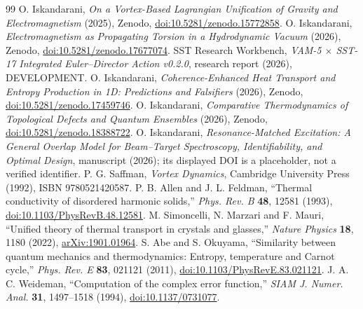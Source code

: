 \documentclass[11pt,a4paper]{article}
\begin{document}
\begin{thebibliography}{99}
 O. Iskandarani, \emph{On a Vortex-Based Lagrangian Unification of Gravity and Electromagnetism} (2025), Zenodo, \href{https://doi.org/10.5281/zenodo.15772858}{doi:10.5281/zenodo.15772858}.
 O. Iskandarani, \emph{Electromagnetism as Propagating Torsion in a Hydrodynamic Vacuum} (2026), Zenodo, \href{https://doi.org/10.5281/zenodo.17677074}{doi:10.5281/zenodo.17677074}.
 SST Research Workbench, \emph{VAM-5 $\times$ SST-17 Integrated Euler--Director Action v0.2.0}, research report (2026), DEVELOPMENT.
 O. Iskandarani, \emph{Coherence-Enhanced Heat Transport and Entropy Production in 1D: Predictions and Falsifiers} (2026), Zenodo, \href{https://doi.org/10.5281/zenodo.17459746}{doi:10.5281/zenodo.17459746}.
 O. Iskandarani, \emph{Comparative Thermodynamics of Topological Defects and Quantum Ensembles} (2026), Zenodo, \href{https://doi.org/10.5281/zenodo.18388722}{doi:10.5281/zenodo.18388722}.
 O. Iskandarani, \emph{Resonance-Matched Excitation: A General Overlap Model for Beam--Target Spectroscopy, Identifiability, and Optimal Design}, manuscript (2026); its displayed DOI is a placeholder, not a verified identifier.
 P. G. Saffman, \emph{Vortex Dynamics}, Cambridge University Press (1992), ISBN 9780521420587.
 P. B. Allen and J. L. Feldman, ``Thermal conductivity of disordered harmonic solids,'' \emph{Phys. Rev. B} \textbf{48}, 12581 (1993), \href{https://doi.org/10.1103/PhysRevB.48.12581}{doi:10.1103/PhysRevB.48.12581}.
 M. Simoncelli, N. Marzari and F. Mauri, ``Unified theory of thermal transport in crystals and glasses,'' \emph{Nature Physics} \textbf{18}, 1180 (2022), \href{https://arxiv.org/abs/1901.01964}{arXiv:1901.01964}.
 S. Abe and S. Okuyama, ``Similarity between quantum mechanics and thermodynamics: Entropy, temperature and Carnot cycle,'' \emph{Phys. Rev. E} \textbf{83}, 021121 (2011), \href{https://doi.org/10.1103/PhysRevE.83.021121}{doi:10.1103/PhysRevE.83.021121}.
 J. A. C. Weideman, ``Computation of the complex error function,'' \emph{SIAM J. Numer. Anal.} \textbf{31}, 1497--1518 (1994), \href{https://doi.org/10.1137/0731077}{doi:10.1137/0731077}.
\end{thebibliography}
\end{document}
